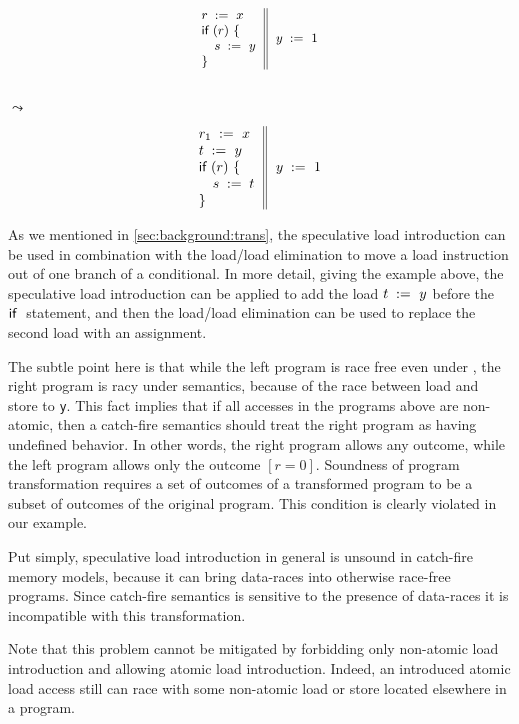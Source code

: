 \begin{minipage}{0.43\linewidth}
\begin{equation*}
\small
\inarrII{
  \readInst{}{r}{x}      \\
  \kw{if} {(r)} ~\{      \\
  \quad\readInst{}{s}{y} \\
  \}

}{
  \writeInst{}{y}{1}       \\
}
\label{ex:sliA}
\end{equation*}
\end{minipage}\hfill%
\begin{minipage}{0.09\linewidth}
\Large~\\ $\leadsto$
\end{minipage}\hfill%
\begin{minipage}{0.43\linewidth}
\begin{equation*}
\inarrII{
  \readInst{}{r_1}{x}      \\
  \readInst{}{t}{y}        \\
  \kw{if} {(r)} ~\{        \\
  \quad\assignInst{s}{t}   \\
  \}

}{
  \writeInst{}{y}{1}       \\
}
\label{ex:sliB}
\end{equation*}
\end{minipage}
 
As we mentioned in \cref{sec:background:trans}, 
the speculative load introduction can be used 
in combination with the load/load elimination 
to move a load instruction out of one branch of a conditional.
In more detail, giving the example above, 
the speculative load introduction can be applied
to add the load $t\;:=_{}\;y$ before the $\textsf{if}~$ statement, 
and then the load/load elimination can be used 
to replace the second load with an assignment. 

The subtle point here is that while the 
left program is race free even under \SC, 
the right program is racy under \SC semantics,
because of the race between load and store to \texttt{y}.
This fact implies that if all accesses in the programs above 
are non-atomic, then a catch-fire semantics should 
treat the right program as having undefined behavior.
In other words, the right program allows any outcome,
while the left program allows only the outcome ${[r=0]}$.
Soundness of program transformation requires 
a set of outcomes of a transformed program 
to be a subset of outcomes of the original program. 
This condition is clearly violated in our example. 

Put simply, speculative load introduction in general
is unsound in catch-fire memory models, 
because it can bring data-races into otherwise 
race-free programs. Since catch-fire semantics
is sensitive to the presence of data-races 
it is incompatible with this transformation. 

Note that this problem cannot be mitigated 
by forbidding only non-atomic load introduction
and allowing atomic load introduction. 
Indeed, an introduced atomic load access still 
can race with some non-atomic load or store
located elsewhere in a program.  
